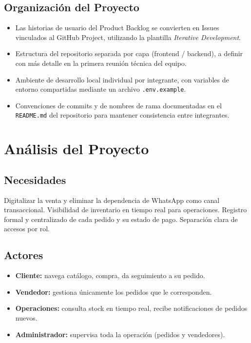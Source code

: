 \documentclass[12pt, a4paper]{article}
\begin{document}
\subsection{Organización del Proyecto}
\begin{itemize}[leftmargin=*]
    \item Las historias de usuario del Product Backlog se convierten en Issues vinculados al GitHub Project, utilizando la plantilla \textit{Iterative Development}.
    \item Estructura del repositorio separada por capa (frontend / backend), a definir con más detalle en la primera reunión técnica del equipo.
    \item Ambiente de desarrollo local individual por integrante, con variables de entorno compartidas mediante un archivo \texttt{.env.example}.
    \item Convenciones de commits y de nombres de rama documentadas en el \texttt{README.md} del repositorio para mantener consistencia entre integrantes.
\end{itemize}


\section{Análisis del Proyecto}

\subsection{Necesidades}
Digitalizar la venta y eliminar la dependencia de WhatsApp como canal transaccional. Visibilidad de inventario en tiempo real para operaciones. Registro formal y centralizado de cada pedido y su estado de pago. Separación clara de accesos por rol.

\subsection{Actores}
\begin{itemize}[leftmargin=*]
    \item \textbf{Cliente:} navega catálogo, compra, da seguimiento a su pedido.
    \item \textbf{Vendedor:} gestiona únicamente los pedidos que le corresponden.
    \item \textbf{Operaciones:} consulta stock en tiempo real, recibe notificaciones de pedidos nuevos.
    \item \textbf{Administrador:} supervisa toda la operación (pedidos y vendedores).
\end{itemize}
\end{document}
